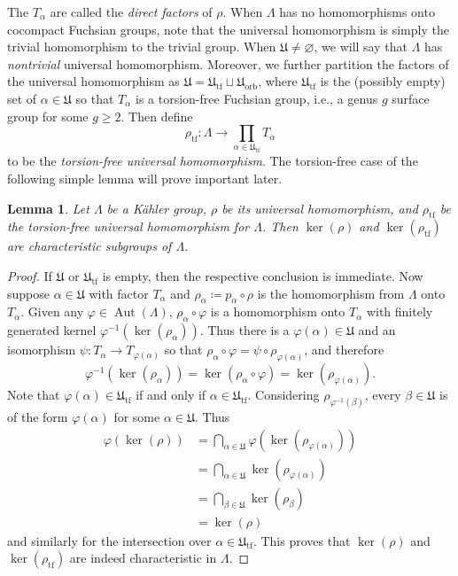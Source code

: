 \documentclass[11pt]{article}
\theoremstyle{plain}
\newtheorem{lem}[thm]{Lemma}
\theoremstyle{definition}
\theoremstyle{remark}
\newcommand{\frakU}{\mathfrak{U}}
\newcommand{\al}{\alpha}
\newcommand{\Lam}{\Lambda}
\DeclareMathOperator{\Aut}{Aut}
\newcommand{\lra}{\longrightarrow}
\newenvironment{pf}{\begin{proof}}{\end{proof}}
\begin{document}
The $T_\al$ are called the \emph{direct factors} of $\rho$. When $\Lam$ has no homomorphisms onto cocompact Fuchsian groups, note that the universal homomorphism is simply the trivial homomorphism to the trivial group. When $\frakU \neq \varnothing$, we will say that $\Lam$ has \emph{nontrivial} universal homomorphism. Moreover, we further partition the factors of the universal homomorphism as $\frakU = \frakU_{\mathrm{tf}} \sqcup \frakU_{\mathrm{orb}}$, where $\frakU_{\mathrm{tf}}$ is the (possibly empty) set of $\al \in \frakU$ so that $T_\al$ is a torsion-free Fuchsian group, i.e., a genus $g$ surface group for some $g \ge 2$. Then define
\begin{equation}\label{eq:UniversalTFHom}
\rho_{\mathrm{tf}} : \Lam \lra \prod_{\al \in \frakU_{\mathrm{tf}}} T_\al
\end{equation}
to be the \emph{torsion-free universal homomorphism}. The torsion-free case of the following simple lemma will prove important later.

\begin{lem}\label{lem:UniversalChar}
Let $\Lam$ be a K\"ahler group, $\rho$ be its universal homomorphism, and $\rho_{\mathrm{tf}}$ be the torsion-free universal homomorphism for $\Lam$. Then $\ker(\rho)$ and $\ker(\rho_{\mathrm{tf}})$ are characteristic subgroups of $\Lam$.
\end{lem}
\begin{pf}
If $\frakU$ or $\frakU_{\mathrm{tf}}$ is empty, then the respective conclusion is immediate. Now suppose $\al \in \frakU$ with factor $T_\al$ and $\rho_\al \coloneqq p_\al \circ \rho$ is the homomorphism from $\Lam$ onto $T_\al$. Given any $\varphi \in \Aut(\Lam)$, $\rho_\al \circ \varphi$ is a homomorphism onto $T_\al$ with finitely generated kernel $\varphi^{-1}(\ker(\rho_\al))$. Thus there is a $\varphi(\al) \in \frakU$ and an isomorphism $\psi : T_\al \to T_{\varphi(\al)}$ so that $\rho_\al \circ \varphi = \psi \circ \rho_{\varphi(\al)}$, and therefore
\begin{equation}\label{eq:AutInvariant}
\varphi^{-1}(\ker(\rho_\al)) = \ker(\rho_\al \circ \varphi) = \ker(\rho_{\varphi(\al)}).
\end{equation}
Note that $\varphi(\al) \in \frakU_{\mathrm{tf}}$ if and only if $\al \in \frakU_{\mathrm{tf}}$. Considering $\rho_{\varphi^{-1}(\beta)}$, every $\beta \in \frakU$ is of the form $\varphi(\al)$ for some $\al \in \frakU$. Thus
\begin{align*}
\varphi(\ker(\rho)) &= \bigcap_{\al \in \frakU} \varphi(\ker(\rho_{\varphi(\al)})) \\
&= \bigcap_{\al \in \frakU} \ker(\rho_{\varphi(\al)}) \\
&= \bigcap_{\beta \in \frakU} \ker(\rho_\beta) \\
&= \ker(\rho)
\end{align*}
and similarly for the intersection over $\al \in \frakU_{\mathrm{tf}}$. This proves that $\ker(\rho)$ and $\ker(\rho_{\mathrm{tf}})$ are indeed characteristic in $\Lam$.
\end{pf}
\end{document}
